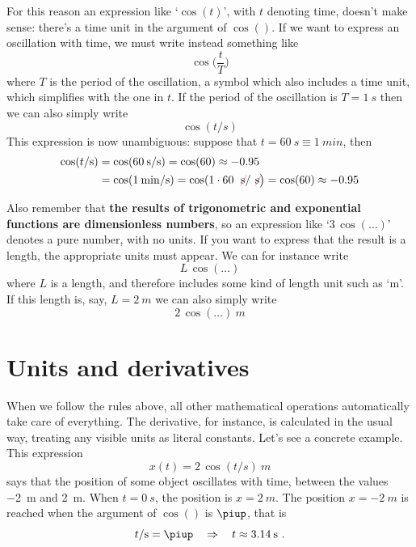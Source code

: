 \documentclass[a4paper,12pt,%
onecolumn,oneside,%
british%
]{memoir}
\newcommand*{\pu}{\piup}%
\newcommand*{\limplies}{\mathbin{\Rightarrow}}%
\renewcommand*{\|}[1][]{\nonscript\:#1\vert\nonscript\:\mathopen{}}
\begin{document}
For this reason an expression like \enquote*{$\cos(t)$}, with $t$ denoting time, doesn't make sense: there's a time unit in the argument of $\cos()$. If we want to express an oscillation with time, we must write instead something like
\begin{equation*}
  \cos\biggl(\frac{t}{T}\biggr)
\end{equation*}
where $T$ is the period of the oscillation, a symbol which also includes a time unit, which simplifies with the one in $t$. If the period of the oscillation is $T=\qty{1}{s}$ then we can also simply write
\begin{equation*}
  \cos(t/\unit{s})
\end{equation*}
This expression is now unambiguous: suppose that $t=\qty{60}{s}\equiv\qty{1}{min}$, then
\begin{equation*}
  \begin{aligned}
    \cos(t/\unit{s})
    &= \cos(\qty{60}{s}/\unit{s}) =\cos(60) \approx -0.95
    \\
    &= \cos(\qty{1}{min}/\unit{s}) =\cos(1\cdot 60\:\mathcolor{red}{\not}\!\unit{s}/\mathcolor{red}{\not}\!\unit{s}\bigr)
=\cos(60) \approx -0.95
  \end{aligned}
\end{equation*}

\smallskip

Also remember that \textbf{the results of trigonometric and exponential functions are dimensionless numbers}, so an expression like \enquote*{$3\,\cos(\dotso)$} denotes a pure number, with no units. If you want to express that the result is a length, the appropriate units must appear. We can for instance write
\begin{equation*}
  L\,\cos(\dotso)
\end{equation*}
where $L$ is a length, and therefore includes some kind of length unit such as \enquote*{\unit{m}}. If this length is, say, $L=\qty{2}{m}$ we can also simply write
\begin{equation*}
  2\,\cos(\dotso)\:\unit{m}
\end{equation*}

\section{Units and derivatives}
\label{sec:units_derivatives}

When we follow the rules above, all other mathematical operations automatically take care of everything. The derivative, for instance, is calculated in the usual way, treating any visible units as literal constants. Let's see a concrete example. This expression
\begin{equation*}
x(t) = 2\,\cos(t/\unit{s})\:\unit{m}
\end{equation*}
says that the position of some object oscillates with time, between the values \qty{-2}{m} and \qty{+2}{m}. When $t=\qty{0}{s}$, the position is $x=\qty{+2}{m}$. The position $x=\qty{-2}{m}$ is reached when the argument of $\cos()$ is $\pu$, that is
\begin{equation*}
  t/\unit{s} = \pu \quad\limplies\quad t\approx \qty{3.14}{s} \ .
\end{equation*}
\end{document}

